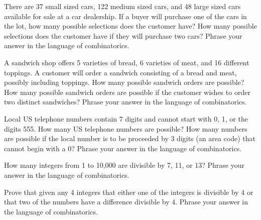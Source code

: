 \documentclass[11pt,letterpaper]{article}
\begin{document}
\homework{}

 There are 37 small sized cars, 122 medium sized cars, and 48 large sized cars available for sale at a car dealership. If a buyer will purchase one of the cars in the lot, how many possible selections does the customer have? How many possible selections does the customer have if they will purchase two cars? Phrase your answer in the language of combinatorics. \pspace





\newpage





 A sandwich shop offers 5 varieties of bread, 6 varieties of meat, and 16 different toppings. A customer will order a sandwich consisting of a bread and meat, possibly including toppings. How many possible sandwich orders are possible? How many possible sandwich orders are possible if the customer wishes to order two distinct sandwiches? Phrase your answer in the language of combinatorics. \pspace





\newpage





 Local US telephone numbers contain 7 digits and cannot start with 0, 1, or the digits 555. How many US telephone numbers are possible? How many numbers are possible if the local number is to be proceeded by 3 digits (an area code) that cannot begin with a 0? Phrase your answer in the language of combinatorics. \pspace





\newpage





 How many integers from 1 to 10,000 are divisible by 7, 11, or 13? Phrase your answer in the language of combinatorics. \pspace





\newpage





 Prove that given any 4 integers that either one of the integers is divisible by 4 or that two of the numbers have a difference divisible by 4. Phrase your answer in the language of combinatorics. \pspace
\end{document}
